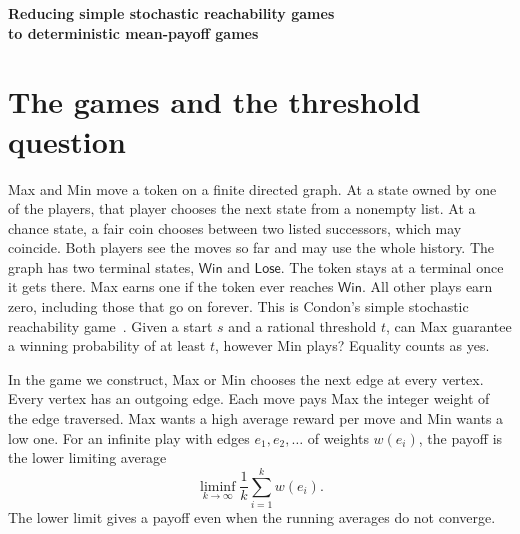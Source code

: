 \documentclass[11pt,letterpaper]{article}
\newcommand*{\manuscriptauthor}{Robert Thomas Collins}
\newcommand{\Win}{\mathsf{Win}}
\newcommand{\Lose}{\mathsf{Lose}}
\begin{document}
\begin{center}
  {\LARGE\bfseries Reducing simple stochastic reachability games\\[.10em]
    to deterministic mean-payoff games\par}
  \medskip{\large\manuscriptauthor\par}
\end{center}

\begin{abstract}
Given a finite simple stochastic reachability game, a start state, and a binary
rational threshold \(t\), we construct one deterministic mean-payoff game with
integer edge weights in polynomial bit time. Its value at the designated start is
nonnegative exactly when the original winning probability under optimal play is at
least \(t\), even when play can continue forever. An explicit error bound lets us
replace fair-coin averages by min/max circuits, including averages that depend on
one another around a cycle.
\end{abstract}

\section{The games and the threshold question}

Max and Min move a token on a finite directed graph. At a state owned by one of
the players, that player chooses the next state from a nonempty list. At a chance
state, a fair coin chooses between two listed successors, which may coincide.
Both players see the moves so far and may use the whole history. The graph
has two terminal states, \(\Win\) and \(\Lose\). The token stays at a terminal
once it gets there. Max earns one if the token ever reaches \(\Win\).
All other plays earn zero, including those that go on forever. This is Condon's simple stochastic reachability game~\cite{condon}.
Given a start \(s\) and a rational threshold \(t\), can Max guarantee a
winning probability of at least \(t\), however Min plays? Equality counts as yes.

In the game we construct, Max or Min chooses the next edge at every vertex.
Every vertex has an outgoing edge. Each move pays Max the integer weight of the
edge traversed. Max wants a high average reward per move and Min wants a low
one. For an infinite play with edges \(e_1,e_2,\ldots\) of weights \(w(e_i)\),
the payoff is the lower limiting average
\[
       \liminf_{k\to\infty}\frac{1}{k}\sum_{i=1}^{k} w(e_i).
\]
The lower limit gives a payoff even when the running averages do not converge.
\end{document}
